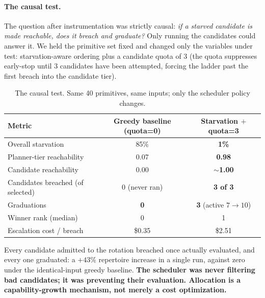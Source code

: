 \documentclass[letterpaper,twocolumn,10pt]{article}
\begin{document}
\paragraph{The causal test.} The question after instrumentation was strictly causal: \emph{if a starved candidate is made reachable, does it breach and graduate?} Only running the candidates could answer it. We held the primitive set fixed and changed only the variables under test: starvation-aware ordering plus a candidate quota of 3 (the quota suppresses early-stop until 3 candidates have been attempted, forcing the ladder past the first breach into the candidate tier).

\begin{table}[t]
\centering
\small
\caption{The causal test. Same 40 primitives, same inputs; only the scheduler policy changes.}
\label{tab:causal}
\begin{tabular}{lcc}
\toprule
Metric & Greedy baseline (quota=0) & Starvation $+$ quota=3 \\
\midrule
Overall starvation        & 85\%       & \textbf{1\%} \\
Planner-tier reachability  & 0.07       & \textbf{0.98} \\
Candidate reachability     & 0.00       & \textbf{$\sim$1.00} \\
Candidates breached (of selected) & 0 (never ran) & \textbf{3 of 3} \\
Graduations                & \textbf{0} & \textbf{3} (active $7\to10$) \\
Winner rank (median)       & 0          & 1 \\
Escalation cost / breach   & \$0.35     & \$2.51 \\
\bottomrule
\end{tabular}
\end{table}

Every candidate admitted to the rotation breached once actually evaluated, and every one graduated: a $+43\%$ repertoire increase in a single run, against zero under the identical-input greedy baseline. \textbf{The scheduler was never filtering bad candidates; it was preventing their evaluation. Allocation is a capability-growth mechanism, not merely a cost optimization.}
\end{document}
